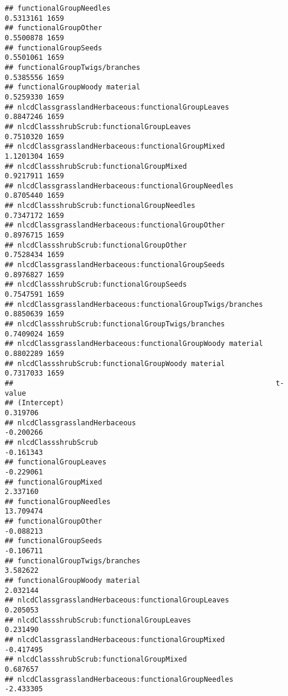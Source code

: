 \documentclass[]{article}
\begin{document}
\begin{verbatim}
## functionalGroupNeedles                                     0.5313161 1659
## functionalGroupOther                                       0.5500878 1659
## functionalGroupSeeds                                       0.5501061 1659
## functionalGroupTwigs/branches                              0.5385556 1659
## functionalGroupWoody material                              0.5259330 1659
## nlcdClassgrasslandHerbaceous:functionalGroupLeaves         0.8847246 1659
## nlcdClassshrubScrub:functionalGroupLeaves                  0.7510320 1659
## nlcdClassgrasslandHerbaceous:functionalGroupMixed          1.1201304 1659
## nlcdClassshrubScrub:functionalGroupMixed                   0.9217911 1659
## nlcdClassgrasslandHerbaceous:functionalGroupNeedles        0.8705440 1659
## nlcdClassshrubScrub:functionalGroupNeedles                 0.7347172 1659
## nlcdClassgrasslandHerbaceous:functionalGroupOther          0.8976715 1659
## nlcdClassshrubScrub:functionalGroupOther                   0.7528434 1659
## nlcdClassgrasslandHerbaceous:functionalGroupSeeds          0.8976827 1659
## nlcdClassshrubScrub:functionalGroupSeeds                   0.7547591 1659
## nlcdClassgrasslandHerbaceous:functionalGroupTwigs/branches 0.8850639 1659
## nlcdClassshrubScrub:functionalGroupTwigs/branches          0.7409024 1659
## nlcdClassgrasslandHerbaceous:functionalGroupWoody material 0.8802289 1659
## nlcdClassshrubScrub:functionalGroupWoody material          0.7317033 1659
##                                                              t-value
## (Intercept)                                                 0.319706
## nlcdClassgrasslandHerbaceous                               -0.200266
## nlcdClassshrubScrub                                        -0.161343
## functionalGroupLeaves                                      -0.229061
## functionalGroupMixed                                        2.337160
## functionalGroupNeedles                                     13.709474
## functionalGroupOther                                       -0.088213
## functionalGroupSeeds                                       -0.106711
## functionalGroupTwigs/branches                               3.582622
## functionalGroupWoody material                               2.032144
## nlcdClassgrasslandHerbaceous:functionalGroupLeaves          0.205053
## nlcdClassshrubScrub:functionalGroupLeaves                   0.231490
## nlcdClassgrasslandHerbaceous:functionalGroupMixed          -0.417495
## nlcdClassshrubScrub:functionalGroupMixed                    0.687657
## nlcdClassgrasslandHerbaceous:functionalGroupNeedles        -2.433305

\end{verbatim}
\end{document}
